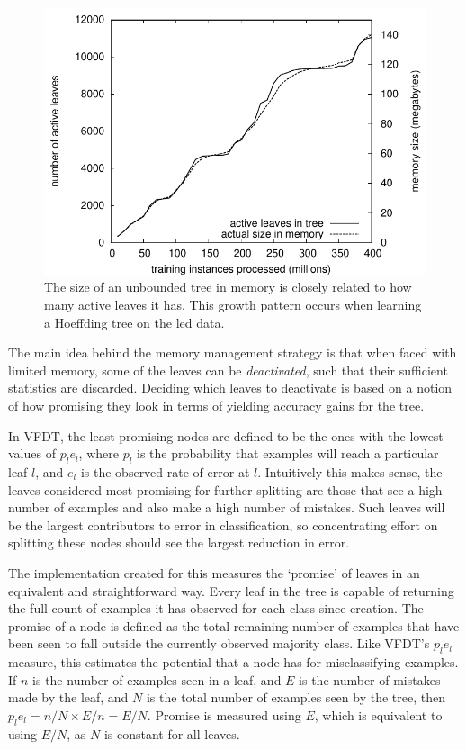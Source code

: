 \begin{figure}
\includegraphics{figures/leaves_bytes}
\caption{The size of an unbounded tree in memory is closely related to how many active leaves it has. This growth pattern occurs when learning a Hoeffding tree on the {\sc led} data.}
\label{fig:leaves_bytes}
\end{figure}

The main idea behind the memory management strategy is that when faced with limited memory, some of the leaves can be {\em deactivated}, such that their sufficient statistics are discarded. Deciding which leaves to deactivate is based on a notion of how promising they look in terms of yielding accuracy gains for the tree.

In VFDT, the least promising nodes are defined to be the ones with the lowest values of $p_{l}e_{l}$, where $p_{l}$ is the probability that examples will reach a particular leaf $l$, and $e_{l}$ is the observed rate of error at $l$. Intuitively this makes sense, the leaves considered most promising for further splitting are those that see a high number of examples and also make a high number of mistakes. Such leaves will be the largest contributors to error in classification, so concentrating effort on splitting these nodes should see the largest reduction in error.

The implementation created for this \thesis  measures the `promise' of leaves in an equivalent and straightforward way. Every leaf in the tree is capable of returning the full count of examples it has observed for each class since creation. The promise of a node is defined as the total remaining number of examples that have been seen to fall outside the currently observed majority class. Like VFDT's $p_{l}e_{l}$ measure, this estimates the potential that a node has for misclassifying examples. If $n$ is the number of examples seen in a leaf, and $E$ is the number of mistakes made by the leaf, and $N$ is the total number of examples seen by the tree, then $p_{l}e_{l} = n/N \times E/n = E/N$. Promise is measured using $E$, which is equivalent to using $E/N$, as $N$ is constant for all leaves.

